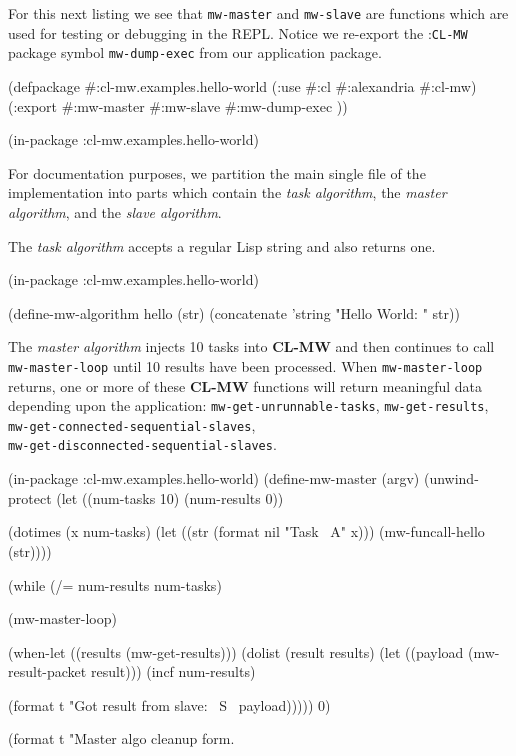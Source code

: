 \documentclass[titlepage,12pt]{book}
\newcommand{\xsmall}{\latexhtml{\small}{}}
\newcommand{\xnormalsize}{\latexhtml{\normalsize}{}}
\newcommand{\clmw}{\xsmall\textbf{CL-MW}\xnormalsize\xspace}
\newcommand{\package}[1]{\mbox{:\uppercase{\xsmall\texttt{#1}\xnormalsize}} package\xspace}
\newcommand{\mwpackage}{\package{CL-MW}}
\newcommand{\sa}{\textit{slave algorithm}\xspace}
\newcommand{\ma}{\textit{master algorithm}\xspace}
\newcommand{\ta}{\textit{task algorithm}\xspace}
\newcommand{\func}[1]{\xsmall\mbox{\uppercase{\texttt{#1}}}\xnormalsize\xspace}
\newcommand{\file}[1]{\texttt{#1}\xspace}
\newcommand{\bold}[1]{\textbf{#1}\xspace}
\begin{document}
For this next listing we see that \func{mw-master} and \func{mw-slave}
are functions which are used for testing or debugging in the
REPL. Notice we re-export the \mwpackage symbol \func{mw-dump-exec}
from our application package.

\begin{lisp}[caption=\file{package.lisp}]
(defpackage #:cl-mw.examples.hello-world
  (:use #:cl #:alexandria #:cl-mw)
  (:export #:mw-master
           #:mw-slave
           #:mw-dump-exec ))

(in-package :cl-mw.examples.hello-world)
\end{lisp}

For documentation purposes, we partition the main single file of the
implementation into parts which contain the \ta, the \ma, and the \sa.

The \ta accepts a regular Lisp string and also returns one.

\begin{lisp}[caption=\file{hello-world.lisp: \bold{Part 1 of 4}}]
(in-package :cl-mw.examples.hello-world)

(define-mw-algorithm hello (str)
  (concatenate 'string "Hello World: " str))
\end{lisp}

The \ma injects 10 tasks into \clmw and then continues
to call \func{mw-master-loop} until 10 results have been
processed.  When \func{mw-master-loop} returns, one or
more of these \clmw functions will return meaningful data
depending upon the application: \func{mw-get-unrunnable-tasks},
\func{mw-get-results}, \func{mw-get-connected-sequential-slaves},\\
\func{mw-get-disconnected-sequential-slaves}.

\begin{lisp}[caption=\file{hello-world.lisp: \bold{Part 2 of 4}}]
(in-package :cl-mw.examples.hello-world)
(define-mw-master (argv)
    (unwind-protect
         (let ((num-tasks 10)
               (num-results 0))

           (dotimes (x num-tasks)
             (let ((str (format nil "Task ~A" x)))
               (mw-funcall-hello (str))))

           (while (/= num-results num-tasks)

             (mw-master-loop)

             (when-let ((results (mw-get-results)))
               (dolist (result results)
                 (let ((payload (mw-result-packet result)))
                   (incf num-results)

                   (format t "Got result from slave: ~S~%
                           payload)))))
           0)

      (format t "Master algo cleanup form.~%
\end{lisp}
\end{document}
